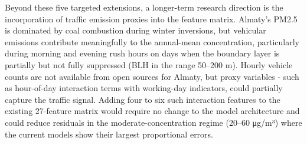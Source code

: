 Beyond these five targeted extensions, a longer-term research direction is the incorporation of traffic emission proxies into the feature matrix. Almaty's PM2.5 is dominated by coal combustion during winter inversions, but vehicular emissions contribute meaningfully to the annual-mean concentration, particularly during morning and evening rush hours on days when the boundary layer is partially but not fully suppressed (BLH in the range 50--200 m). Hourly vehicle counts are not available from open sources for Almaty, but proxy variables - such as hour-of-day interaction terms with working-day indicators, could partially capture the traffic signal. Adding four to six such interaction features to the existing 27-feature matrix would require no change to the model architecture and could reduce residuals in the moderate-concentration regime (20--60 μg/m³) where the current models show their largest proportional errors.
